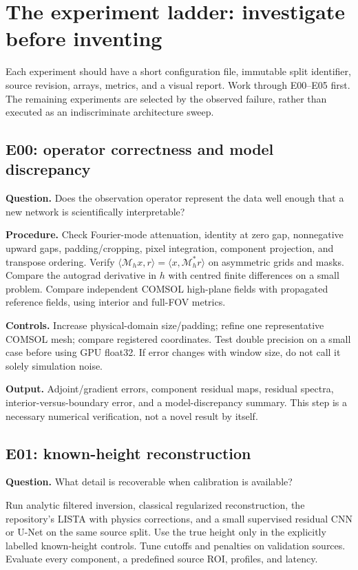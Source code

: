 \section{The experiment ladder: investigate before inventing}
\label{sec:experiments}
Each experiment should have a short configuration file, immutable split identifier, source revision, arrays, metrics, and a visual report. Work through E00--E05 first. The remaining experiments are selected by the observed failure, rather than executed as an indiscriminate architecture sweep.

\subsection{E00: operator correctness and model discrepancy}
\textbf{Question.} Does the observation operator represent the data well enough that a new network is scientifically interpretable?

\textbf{Procedure.} Check Fourier-mode attenuation, identity at zero gap, nonnegative upward gaps, padding/cropping, pixel integration, component projection, and transpose ordering. Verify $\langle\mathcal M_hx,r\rangle=\langle x,\mathcal M_h^*r\rangle$ on asymmetric grids and masks. Compare the autograd derivative in $h$ with centred finite differences on a small problem. Compare independent COMSOL high-plane fields with propagated reference fields, using interior and full-FOV metrics.

\textbf{Controls.} Increase physical-domain size/padding; refine one representative COMSOL mesh; compare registered coordinates. Test double precision on a small case before using GPU float32. If error changes with window size, do not call it solely simulation noise.

\textbf{Output.} Adjoint/gradient errors, component residual maps, residual spectra, interior-versus-boundary error, and a model-discrepancy summary. This step is a necessary numerical verification, not a novel result by itself.

\subsection{E01: known-height reconstruction}
\textbf{Question.} What detail is recoverable when calibration is available?

Run analytic filtered inversion, classical regularized reconstruction, the repository's LISTA with physics corrections, and a small supervised residual CNN or U-Net on the same source split. Use the true height only in the explicitly labelled known-height controls. Tune cutoffs and penalties on validation sources. Evaluate every component, a predefined source ROI, profiles, and latency.

